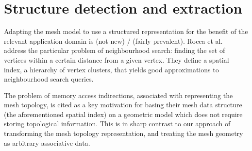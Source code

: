 




\section{Structure detection and extraction}




Adapting the mesh model to use a structured representation for the benefit of the relevant application domain is (not new) / (fairly prevalent).
Rocca et al.~\cite{rocca2011fast} address the particular problem of neighbourhood search: finding the set of vertices within a certain distance from a given vertex. They define a spatial index, a hierarchy of vertex clusters, that yields good approximations to neighbourhood search queries.

The problem of memory access indirections, associated with representing the mesh topology, is cited as a key motivation for basing their mesh data structure (the aforementioned spatial index) on a geometric model which does not require storing topological information. This is in sharp contrast to our approach of transforming the mesh topology representation, and treating the mesh geometry as arbitrary associative data.





